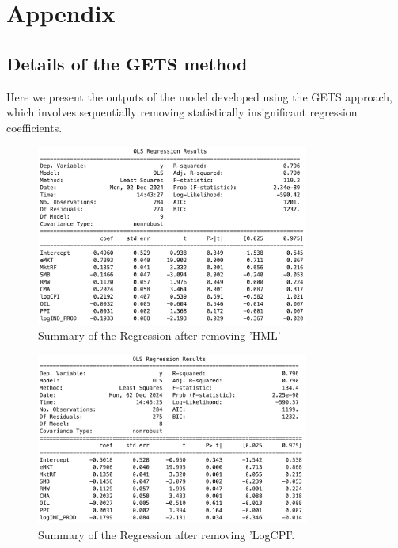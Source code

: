 \documentclass[12pt, openright, oneside]{report}
\begin{document}
\appendix
\chapter*{Appendix}
\renewcommand{\thesection}{\Alph{section}}


\section{Details of the GETS method}\label{appendix:GETS}

Here we present the outputs of the model developed using the GETS approach, which involves sequentially removing
statistically insignificant regression coefficients.

\begin{figure}[h]
    \centering
    \includegraphics[width=0.8\textwidth]{images/HML1.png}
    \caption{Summary of the Regression after removing 'HML'}\label{fig:HML1}
\end{figure} 

\begin{figure}[h]
    \centering
    \includegraphics[width=0.8\textwidth]{images/LogCPI2.png}
    \caption{Summary of the Regression after removing 'LogCPI'.}\label{fig:CPI2}
\end{figure} 
\end{document}
